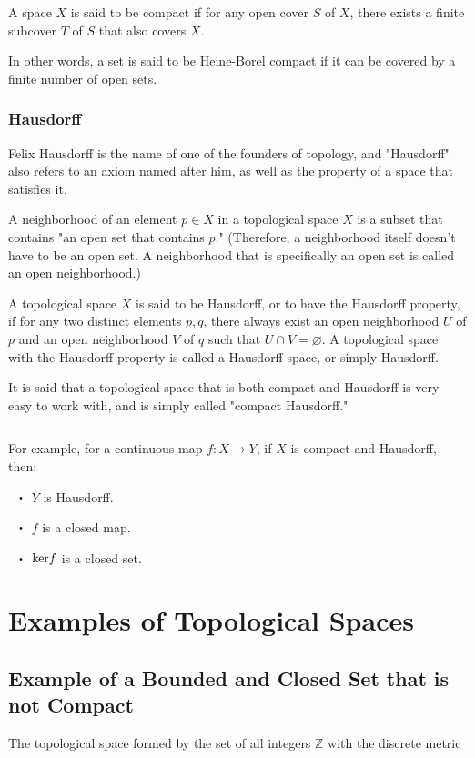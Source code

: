 \documentclass{article}
\begin{document}
A space $X$ is said to be compact if for any open cover $S$ of $X$, there exists a finite subcover $T$ of $S$ that also covers $X$.

In other words, a set is said to be Heine-Borel compact if it can be covered by a finite number of open sets.

\subsubsection{Hausdorff}

Felix Hausdorff is the name of one of the founders of topology, and "Hausdorff" also refers to an axiom named after him, as well as the property of a space that satisfies it.

A neighborhood of an element $p \in X$ in a topological space $X$ is a subset that contains "an open set that contains $p$." (Therefore, a neighborhood itself doesn't have to be an open set. A neighborhood that is specifically an open set is called an open neighborhood.)

A topological space $X$ is said to be Hausdorff, or to have the Hausdorff property, if for any two distinct elements $p,q$, there always exist an open neighborhood $U$ of $p$ and an open neighborhood $V$ of $q$ such that $U \cap V = \varnothing$.
A topological space with the Hausdorff property is called a Hausdorff space, or simply Hausdorff.

It is said that a topological space that is both compact and Hausdorff is very easy to work with, and is simply called "compact Hausdorff."

${}$

For example, for a continuous map $f: X \to Y$, if $X$ is compact and Hausdorff, then:

\ ・ $Y$ is Hausdorff.

\ ・ $f$ is a closed map.

\ ・ ${\rm ker} f $ is a closed set.



\section{Examples of Topological Spaces}

\subsection{Example of a Bounded and Closed Set that is not Compact}

The topological space formed by the set of all integers $\mathbb{Z}$ with the discrete metric
\end{document}
